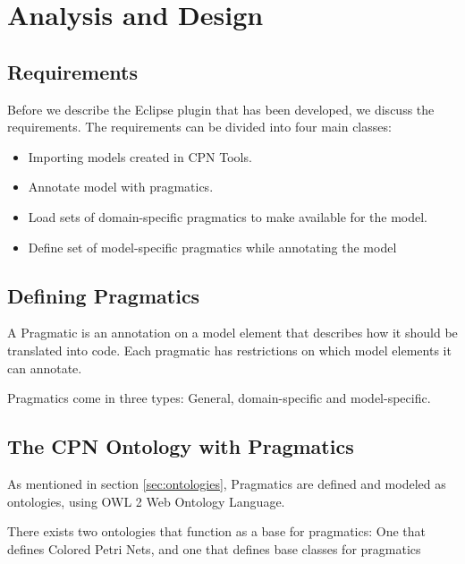 \chapter{Analysis and Design}
\label{chap:analysis}

\section{Requirements} 
Before we describe the Eclipse plugin that has been developed, we discuss the
requirements.
The requirements can be divided into four main classes:

\begin{itemize} 
	\item Importing models created in CPN Tools. 

	\item Annotate model with pragmatics. 
		
	\item Load sets of domain-specific pragmatics to make available for the model.
	
	\item Define set of model-specific pragmatics while annotating the model

\end{itemize}

\section{Defining Pragmatics}

A Pragmatic is an annotation on a model element that describes how it should be
translated into code. Each pragmatic has restrictions on which model elements it
can annotate.

Pragmatics come in three types: General, domain-specific and model-specific.



\section{The CPN Ontology with Pragmatics}
As mentioned in section \ref{sec:ontologies}, Pragmatics are defined and modeled
as ontologies, using OWL 2 Web Ontology Language.  

There exists two ontologies that function as a base for pragmatics: One that
defines Colored Petri Nets, and one that defines base classes for pragmatics

